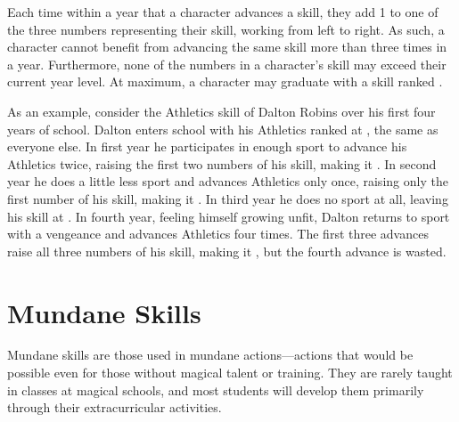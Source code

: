 Each time within a year that a character advances a skill, they add 1 to one of the three numbers representing their skill, working from left to right.
As such, a character cannot benefit from advancing the same skill more than three times in a year.
Furthermore, none of the numbers in a character's skill may exceed their current year level.
At maximum, a character may graduate with a skill ranked .

As an example, consider the Athletics skill of Dalton Robins over his first four years of school.
Dalton enters school with his Athletics ranked at , the same as everyone else.
In first year he participates in enough sport to advance his Athletics twice, raising the first two numbers of his skill, making it .
In second year he does a little less sport and advances Athletics only once, raising only the first number of his skill, making it .
In third year he does no sport at all, leaving his skill at .
In fourth year, feeling himself growing unfit, Dalton returns to sport with a vengeance and advances Athletics four times.
The first three advances raise all three numbers of his skill, making it , but the fourth advance is wasted.

\section{Mundane Skills}

Mundane skills are those used in mundane actions---actions that would be possible even for those without magical talent or training.
They are rarely taught in classes at magical schools, and most students will develop them primarily through their extracurricular activities.











